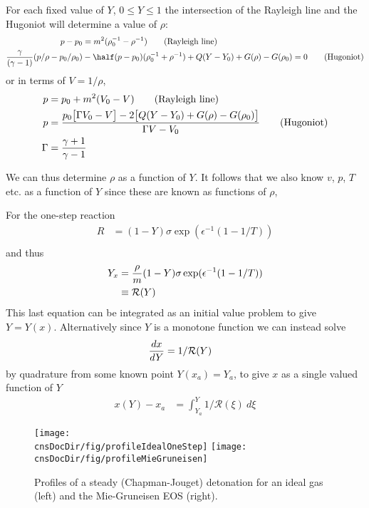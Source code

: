 \documentclass{article}
\newcommand{\cnsDocDir}{\homeHenshaw/cgDoc/cns}
\begin{document}
\newcommand{\vf}{V} %

For each fixed value of $Y$, $0 \le Y \le 1$ the intersection of the Rayleigh line and the Hugoniot
will determine a value of $\rho$:
\begin{align*}
   p - p_0 &= m^2 ( \rho_0^{-1} - \rho^{-1} ) \qquad\mbox{(Rayleigh line)} \\
  {\gamma\over (\gamma-1)} (p/\rho - p_0/\rho_0 ) & -\half(p - p_0)( \rho_0^{-1} + \rho^{-1} ) 
           + Q(Y-Y_0) + G(\rho)-G(\rho_0) =0 \qquad\mbox{(Hugoniot)}
\end{align*}
or in terms of $\vf=1/\rho$, 
\begin{align*}
   p &= p_0 + m^2 ( \vf_0 - \vf ) \qquad\mbox{(Rayleigh line)} \\
   p &= { p_0 \big[ \Gamma \vf_0 - \vf \big] - 2\big[ Q(Y-Y_0) + G(\rho)-G(\rho_0) \big] \over
                 \Gamma\vf -\vf_0 }  \qquad\mbox{(Hugoniot)} \\
  \Gamma &= {\gamma+1 \over \gamma -1} 
\end{align*}

We can thus determine $\rho$ as a function of $Y$. It follows that we also know $v$, $p$, $T$ etc. as a function
of $Y$ since these are known as functions of $\rho$,

For the one-step reaction
\begin{align*}
   R &= (1-Y)\sigma \exp(\epsilon^{-1}(1-1/T)) \\
\end{align*}
and thus
\begin{align*}
  Y_x &= {\rho\over m} (1-Y)\sigma \exp(\epsilon^{-1}(1-1/T)) \\
      &\equiv {\mathcal R}(Y)
\end{align*}
This last equation can be integrated as an initial value problem 
to give $Y=Y(x)$. Alternatively since $Y$ is a monotone function 
we can instead solve
\begin{align*}
  {d x \over d Y} & = 1/{\mathcal R}(Y)
\end{align*}
by quadrature from some known point $Y(x_a)=Y_a$, to give $x$ as a single valued function
of $Y$
\begin{align*}
   x(Y) - x_a &= \int_{Y_a}^Y 1/{\mathcal R}(\xi) ~d\xi
\end{align*}

\begin{figure}[hbt]
 \begin{center}
   \texttt{[image: \\cnsDocDir/fig/profileIdealOneStep]}
   \texttt{[image: \\cnsDocDir/fig/profileMieGruneisen]}
 \end{center}
\caption{Profiles of a steady (Chapman-Jouget) detonation for an ideal gas (left) and
   the Mie-Gruneisen EOS (right). } \label{fig:detonationCJ}
\end{figure}
\end{document}
